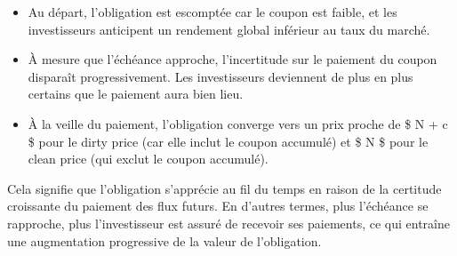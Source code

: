 \documentclass[
  letterpaper,
  DIV=11,
  numbers=noendperiod]{scrartcl}
\providecommand{\tightlist}{%
  \setlength{\itemsep}{0pt}\setlength{\parskip}{0pt}}\usepackage{longtable,booktabs,array}
\begin{document}
\begin{itemize}
\tightlist
\item
  Au départ, l'obligation est escomptée car le coupon est faible, et les
  investisseurs anticipent un rendement global inférieur au taux du
  marché.\\
\item
  À mesure que l'échéance approche, l'incertitude sur le paiement du
  coupon disparaît progressivement. Les investisseurs deviennent de plus
  en plus certains que le paiement aura bien lieu.\\
\item
  À la veille du paiement, l'obligation converge vers un prix proche de
  \$ N + c \$ pour le dirty price (car elle inclut le coupon accumulé)
  et \$ N \$ pour le clean price (qui exclut le coupon accumulé).
\end{itemize}

Cela signifie que l'obligation s'apprécie au fil du temps en raison de
la certitude croissante du paiement des flux futurs. En d'autres termes,
plus l'échéance se rapproche, plus l'investisseur est assuré de recevoir
ses paiements, ce qui entraîne une augmentation progressive de la valeur
de l'obligation.
\end{document}
